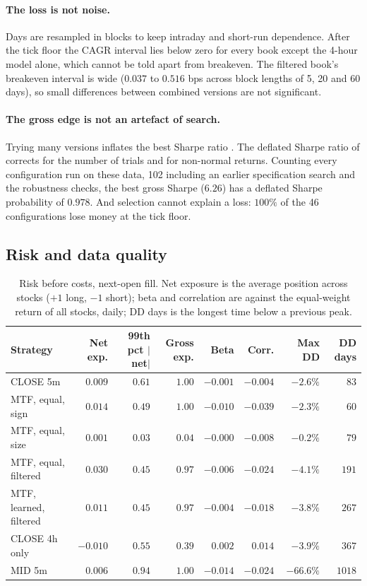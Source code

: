 \documentclass[11pt,a4paper]{article}
\begin{document}
\paragraph{The loss is not noise.} Days are resampled in blocks to keep intraday and short-run dependence.
After the tick floor the CAGR interval lies below zero for every book except the 4-hour model alone, which
cannot be told apart from breakeven. The filtered book's breakeven interval is wide ($0.037$ to $0.516$
bps across block lengths of 5, 20 and 60 days), so small differences between combined versions are not
significant.

\paragraph{The gross edge is not an artefact of search.} Trying many versions inflates the best Sharpe
ratio \citep{harvey2016}. The deflated Sharpe ratio of \citet{bailey2014} corrects for the number of
trials and for non-normal returns. Counting every configuration run on these data, 102 including
an earlier specification search and the robustness checks, the best gross Sharpe ($6.26$) has a
deflated Sharpe probability of $0.978$. And selection cannot explain a loss: $100\%$ of the
46 configurations lose money at the tick floor.

\subsection{Risk and data quality}

\begin{table}[htbp]
\centering
\caption{Risk before costs, next-open fill. Net exposure is the average position across stocks ($+1$ long,
$-1$ short); beta and correlation are against the equal-weight return of all stocks, daily; DD days is
the longest time below a previous peak.}
\label{tab:risk}
\footnotesize
\setlength{\tabcolsep}{3pt}
\begin{tabular}{@{}lrrrrrrr@{}}
\toprule
Strategy & Net exp. & 99th pct $|$net$|$ & Gross exp. & Beta & Corr. & Max DD & DD days \\
\midrule
CLOSE 5m & $0.009$ & $0.61$ & $1.00$ & $-0.001$ & $-0.004$ & $-2.6\%$ & $83$ \\
MTF, equal, sign & $0.014$ & $0.49$ & $1.00$ & $-0.010$ & $-0.039$ & $-2.3\%$ & $60$ \\
MTF, equal, size & $0.001$ & $0.03$ & $0.04$ & $-0.000$ & $-0.008$ & $-0.2\%$ & $79$ \\
MTF, equal, filtered & $0.030$ & $0.45$ & $0.97$ & $-0.006$ & $-0.024$ & $-4.1\%$ & $191$ \\
MTF, learned, filtered & $0.011$ & $0.45$ & $0.97$ & $-0.004$ & $-0.018$ & $-3.8\%$ & $267$ \\
CLOSE 4h only & $-0.010$ & $0.55$ & $0.39$ & $0.002$ & $0.014$ & $-3.9\%$ & $367$ \\
MID 5m & $0.006$ & $0.94$ & $1.00$ & $-0.014$ & $-0.024$ & $-66.6\%$ & $1018$ \\
\bottomrule
\end{tabular}
\end{table}
\end{document}
